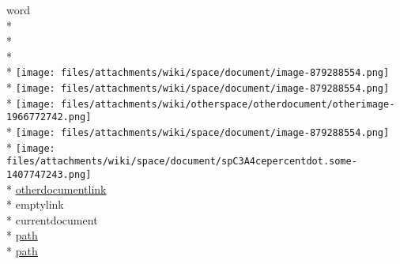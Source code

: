 \documentclass{article}
\begin{document}
word\\*
\\*
\\*
\\*
\texttt{[image: files/attachments/wiki/space/document/image-879288554.png]}\\*
\texttt{[image: files/attachments/wiki/space/document/image-879288554.png]}\\*
\texttt{[image: files/attachments/wiki/otherspace/otherdocument/otherimage-1966772742.png]}\\*
\texttt{[image: files/attachments/wiki/space/document/image-879288554.png]}\\*
\texttt{[image: files/attachments/wiki/space/document/spC3A4cepercentdot.some-1407747243.png]}\\*
\href{http://test/bin/view/OtherSpace/OtherDocument}{otherdocumentlink}\\*
emptylink\\*
currentdocument\\*
\href{https://localhost:8080/xwiki/whatever}{path}\\*
\href{http://localhost:8080/xwiki/whatever}{path}
\end{document}
